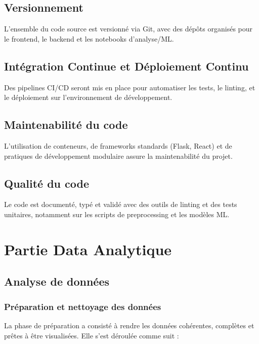 \documentclass[12pt]{report}
\begin{document}
\section{Versionnement}
L’ensemble du code source est versionné via Git, avec des dépôts organisés pour le frontend, le backend et les notebooks d'analyse/ML.

\section{Intégration Continue et Déploiement Continu}
Des pipelines CI/CD seront mis en place pour automatiser les tests, le linting, et le déploiement sur l’environnement de développement.

\section{Maintenabilité du code}
L'utilisation de conteneurs, de frameworks standards (Flask, React) et de pratiques de développement modulaire assure la maintenabilité du projet.

\section{Qualité du code}
Le code est documenté, typé et validé avec des outils de linting et des tests unitaires, notamment sur les scripts de preprocessing et les modèles ML.

\chapter{Partie Data Analytique}

\thispagestyle{plain}
\pagestyle{plain}


\section{Analyse de données}

\subsection{Préparation et nettoyage des données}

La phase de préparation a consisté à rendre les données cohérentes, complètes et prêtes à être visualisées. Elle s’est déroulée comme suit :
\end{document}
